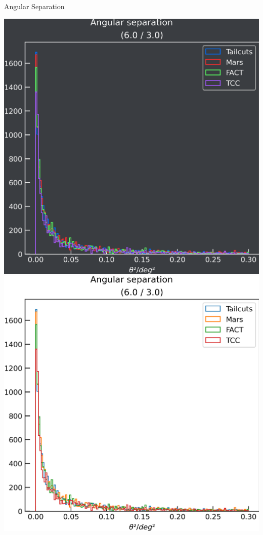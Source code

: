 \begin{frame}{Angular Separation}
\begin{minipage}{0.32\textwidth}
    \fi
  \end{minipage}
  \begin{minipage}{0.32\textwidth}
    \ifdefined\darktheme
      \centering
      \includegraphics[width=\textwidth]{plots/ang_sep/ang_sep__6.0_3.0_dark.png}
    \else
      \centering
      \includegraphics[width=\textwidth]{plots/ang_sep/ang_sep__6.0_3.0_light.png}

\end{minipage}
\end{frame}
